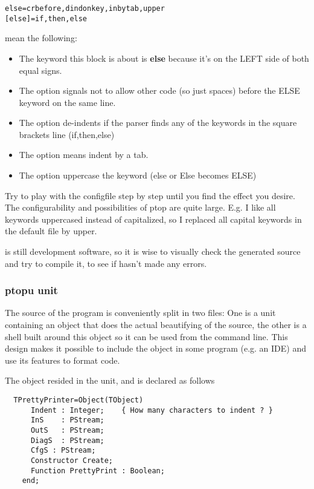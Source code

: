 \begin{verbatim}
else=crbefore,dindonkey,inbytab,upper
[else]=if,then,else
\end{verbatim}

mean the following:

\begin{itemize}
\item The keyword this block is about is \textbf{else} because it's on the LEFT side
of both equal signs.
\item The option  signals not to allow other code (so just spaces)
before the ELSE keyword on the same line.
\item The option  de-indents if the parser finds any of the keywords
 in the square brackets line (if,then,else)
\item The option  means indent by a tab.
\item The option  uppercase the keyword (else or Else becomes ELSE)
\end{itemize}

Try to play with the configfile step by step until you find the effect you desire.
The configurability and possibilities of ptop are quite large. E.g. I like all
keywords uppercased instead of capitalized, so I replaced all capital keywords in
the default file by upper.

 is still development software, so it is wise to visually check the generated
source and try to compile it, to see if  hasn't made any errors.

\subsubsection{ptopu unit}

The source of the  program is conveniently split in two files:
One is a unit containing an object that does the actual beautifying of the
source, the other is a shell built around this object so it can be used
from the command line. This design makes it possible to include the object
in some program (e.g. an IDE) and use its features to format code.

The object resided in the  unit, and is declared as follows
\begin{verbatim}
  TPrettyPrinter=Object(TObject)
      Indent : Integer;    { How many characters to indent ? }
      InS    : PStream;
      OutS   : PStream;
      DiagS  : PStream;
      CfgS : PStream;
      Constructor Create;
      Function PrettyPrint : Boolean;
    end;
\end{verbatim}

